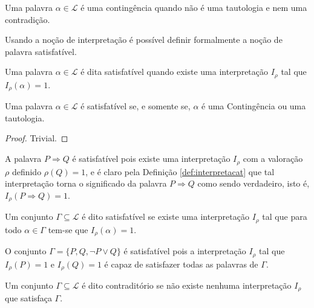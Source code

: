 \begin{definicao}[Contingência]
  Uma palavra $\alpha \in \mathcal{L}$ é uma contingência quando não é uma tautologia e nem uma contradição.
\end{definicao}

Usando a noção de interpretação é possível definir formalmente a noção de palavra satisfatível.

\begin{definicao}
  Uma palavra $\alpha \in \mathcal{L}$ é dita satisfatível quando existe uma interpretação $I_\rho$ tal que $I_\rho(\alpha) = 1$.
\end{definicao}

\begin{proposicao}
  Uma palavra $\alpha \in \mathcal{L}$ é satisfatível se, e somente se, $\alpha$ é uma Contingência ou uma tautologia.
\end{proposicao}

\begin{proof}
  Trivial.
\end{proof}

\begin{exemplo}
  A palavra $P \Rightarrow Q$ é satisfatível pois existe uma interpretação $I_\rho$ com a valoração $\rho$ definido $\rho(Q) = 1$, e é claro pela Definição \ref{def:interpretacat} que tal interpretação torna o significado da palavra $P \Rightarrow Q$ como sendo verdadeiro, isto é, $I_\rho(P \Rightarrow Q) = 1$.
\end{exemplo}

\begin{definicao}
  Um conjunto $\Gamma \subseteq \mathcal{L}$ é dito satisfatível se existe uma interpretação $I_\rho$ tal que para todo $\alpha \in \Gamma$ tem-se que $I_\rho(\alpha) = 1$.
\end{definicao}

\begin{exemplo}
  O conjunto $\Gamma = \{P, Q, \neg P \lor Q\}$ é satisfatível pois a interpretação $I_\rho$ tal que $I_\rho(P) = 1$ e $I_\rho(Q) = 1$ é capaz de satisfazer todas as palavras de $\Gamma$.
\end{exemplo}

\begin{definicao}
  Um conjunto $\Gamma \subseteq \mathcal{L}$ é dito contraditório se não existe nenhuma interpretação $I_\rho$ que satisfaça $\Gamma$.
\end{definicao}

